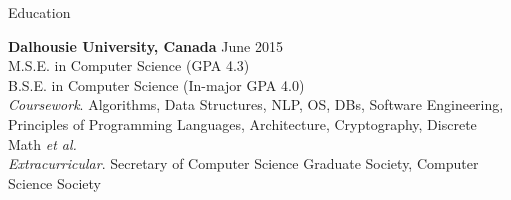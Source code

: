 \documentclass{resume} %
\begin{document}

\begin{rSection}{Education}

{\bf Dalhousie University, Canada} \hfill {June 2015} \\ 
M.S.E. in Computer Science (GPA 4.3) \\
B.S.E. in Computer Science (In-major GPA 4.0) \smallskip \\
\textit{Coursework}. Algorithms, Data Structures, NLP, OS, DBs, Software Engineering, \\
Principles of Programming Languages, Architecture, Cryptography, Discrete Math \textit{et al.} \smallskip \\
\textit{Extracurricular}. Secretary of Computer Science Graduate Society, Computer Science Society

\end{rSection}

\end{document}

